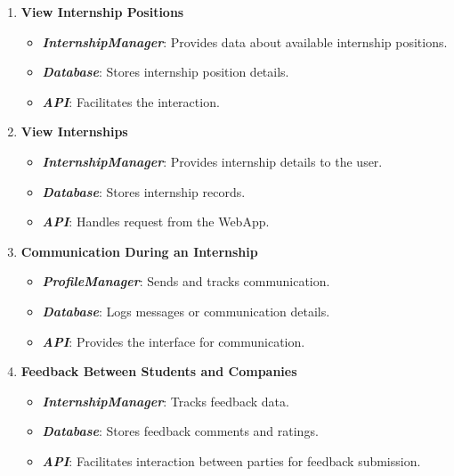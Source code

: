 \begin{enumerate}
        \item \textbf{View Internship Positions}
        \begin{itemize}
            \item \textit{\textbf{InternshipManager}}: Provides data about available internship positions.
            \item \textit{\textbf{Database}}: Stores internship position details.
            \item \textit{\textbf{API}}: Facilitates the interaction.
        \end{itemize}

        \item \textbf{View Internships}
        \begin{itemize}
            \item \textit{\textbf{InternshipManager}}: Provides internship details to the user.
            \item \textit{\textbf{Database}}: Stores internship records.
            \item \textit{\textbf{API}}: Handles request from the WebApp.
        \end{itemize}

        \item \textbf{Communication During an Internship}
        \begin{itemize}
            \item \textit{\textbf{ProfileManager}}:  Sends and tracks communication.    
            \item \textit{\textbf{Database}}: Logs messages or communication details.
            \item \textit{\textbf{API}}: Provides the interface for communication.
        \end{itemize}

        \item \textbf{Feedback Between Students and Companies}
        \begin{itemize}
            \item \textit{\textbf{InternshipManager}}: Tracks feedback data.
            \item \textit{\textbf{Database}}: Stores feedback comments and ratings.
            \item \textit{\textbf{API}}: Facilitates interaction between parties for feedback submission.
        \end{itemize}


\end{enumerate}
